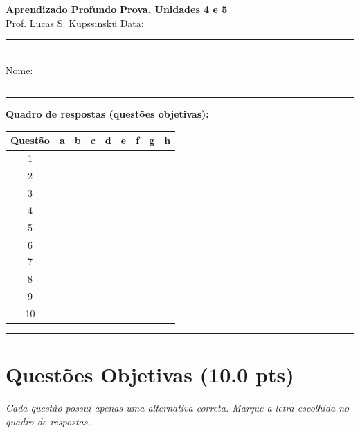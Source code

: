 \documentclass[11pt,a4paper]{article}
\begin{document}
{\Large\bfseries Aprendizado Profundo} \hfill \textbf{Prova, Unidades 4 e 5}\\
Prof. Lucas S. Kupssinskü \hfill Data: \rule{3cm}{0.4pt}\\[0.4em]
Nome: \rule{12cm}{0.4pt}

\rule{\linewidth}{0.8pt}

\textbf{Quadro de respostas (questões objetivas):}\\[0.3em]
\begin{center}
\begin{tabular}{|c|c|c|c|c|c|c|c|c|}
\hline
\textbf{Questão} & \textbf{a} & \textbf{b} & \textbf{c} & \textbf{d} & \textbf{e} & \textbf{f} & \textbf{g} & \textbf{h} \\\hline
1  & & & & & & & & \\\hline
2  & & & & & & & & \\\hline
3  & & & & & & & & \\\hline
4  & & & & & & & & \\\hline
5  & & & & & & & & \\\hline
6  & & & & & & & & \\\hline
7  & & & & & & & & \\\hline
8  & & & & & & & & \\\hline
9  & & & & & & & & \\\hline
10 & & & & & & & & \\\hline
\end{tabular}
\end{center}

\rule{\linewidth}{0.4pt}

\section*{Questões Objetivas (10.0 pts)}
\textit{Cada questão possui apenas uma alternativa correta. Marque a letra escolhida no quadro de respostas.}
\end{document}
